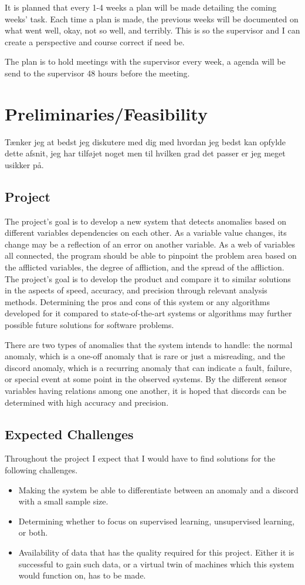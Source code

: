 \documentclass[a4paper,8pt]{article}
\begin{document}
	It is planned that every 1-4 weeks a plan will be made detailing the coming weeks' task. Each time a plan is made, the previous weeks will be documented on what went well, okay, not so well, and terribly. This is so the supervisor and I can create a perspective and course correct if need be.
	
	The plan is to hold meetings with the supervisor every week, a agenda will be send to the supervisor 48 hours before the meeting.

	
	\section{Preliminaries/Feasibility}
		Tænker jeg at bedst jeg diskutere med dig med hvordan jeg bedst kan opfylde dette afsnit, jeg har tilføjet noget men til hvilken grad det passer er jeg meget usikker på.
	
	\subsection{Project}
		The project's goal is to develop a new system that detects anomalies based on different variables dependencies on each other. As a variable value changes, its change may be a reflection of an error on another variable. As a web of variables all connected, the program should be able to pinpoint the problem area based on the afflicted variables, the degree of affliction, and the spread of the affliction. The project's goal is to develop the product and compare it to similar solutions in the aspects of speed, accuracy, and precision through relevant analysis methods. Determining the pros and cons of this system or any algorithms developed for it compared to state-of-the-art systems or algorithms may further possible future solutions for software problems.
	
		There are two types of anomalies that the system intends to handle: the normal anomaly, which is a one-off anomaly that is rare or just a misreading, and the discord anomaly, which is a recurring anomaly that can indicate a fault, failure, or special event at some point in the observed systems. By the different sensor variables having relations among one another, it is hoped that discords can be determined with high accuracy and precision.
		
	\subsection{Expected Challenges}
		Throughout the project I expect that I would have to find solutions for the following challenges.
		\begin{itemize}
			\item Making the system be able to differentiate between an anomaly and a discord with a small sample size.
			\item Determining whether to focus on supervised learning, unsupervised learning, or both.
			\item Availability of data that has the quality required for this project. Either it is successful to gain such data, or a virtual twin of machines which this system would function on, has to be made.
		\end{itemize}
		
	\printbibliography
	
\end{document}

